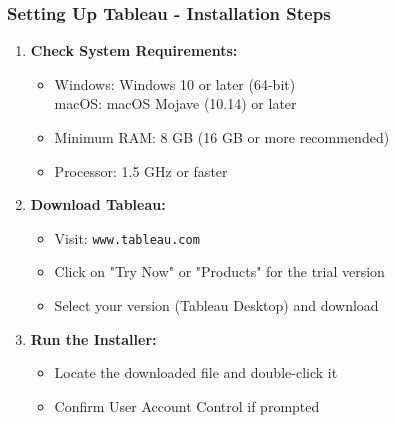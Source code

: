 \documentclass[aspectratio=169]{beamer}
\begin{document}
\begin{frame}[fragile]
    \frametitle{Setting Up Tableau - Installation Steps}
    \begin{enumerate}
        \item \textbf{Check System Requirements:}
        \begin{itemize}
            \item Windows: Windows 10 or later (64-bit) \\
            macOS: macOS Mojave (10.14) or later
            \item Minimum RAM: 8 GB (16 GB or more recommended)
            \item Processor: 1.5 GHz or faster
        \end{itemize}
        
        \item \textbf{Download Tableau:}
        \begin{itemize}
            \item Visit: \texttt{www.tableau.com}
            \item Click on "Try Now" or "Products" for the trial version
            \item Select your version (Tableau Desktop) and download
        \end{itemize}
        
        \item \textbf{Run the Installer:}
        \begin{itemize}
            \item Locate the downloaded file and double-click it
            \item Confirm User Account Control if prompted
        \end{itemize}
    \end{enumerate}
\end{frame}
\end{document}
